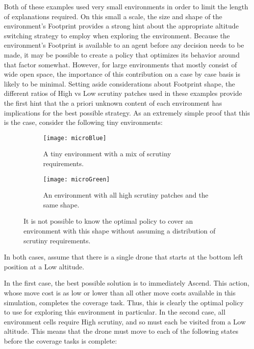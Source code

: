 Both of these examples used very small environments in order to limit the length of explanations required. On this small a scale, the size and shape of the environment's Footprint provides a strong hint about the appropriate altitude switching strategy to employ when exploring the environment. Because the environment's Footprint is available to an agent before any decision needs to be made, it may be possible to create a policy that optimizes its behavior around that factor somewhat. However, for large environments that mostly consist of wide open space, the importance of this contribution on a case by case basis is likely to be minimal. Setting aside considerations about Footprint shape, the different ratios of High vs Low scrutiny patches used in these examples provide the first hint that the a priori unknown content of each environment has implications for the best possible strategy. As an extremely simple proof that this is the case, consider the following tiny environments:

\begin{figure}[H]
\begin{subfigure}{.5\textwidth}
  \centering
  \texttt{[image: microBlue]}
  \caption{A tiny environment with a mix of scrutiny requirements.}
\end{subfigure}
\begin{subfigure}{.5\textwidth}
  \centering
  \texttt{[image: microGreen]}
  \caption{An environment with all high scrutiny patches and the same shape.}
\end{subfigure}
\caption[Minimal Environments with Uncertain Policies]{It is not possible to know the optimal policy to cover an environment with this shape without assuming a distribution of scrutiny requirements.}
\end{figure}

In both cases, assume that there is a single drone that starts at the bottom left position at a Low altitude.

In the first case, the best possible solution is to immediately Ascend. This action, whose move cost is as low or lower than all other move costs available in this simulation, completes the coverage task. Thus, this is clearly the optimal policy to use for exploring this environment in particular. In the second case, all environment cells require High scrutiny, and so must each be visited from a Low altitude. This means that the drone must move to each of the following states before the coverage tasks is complete:

